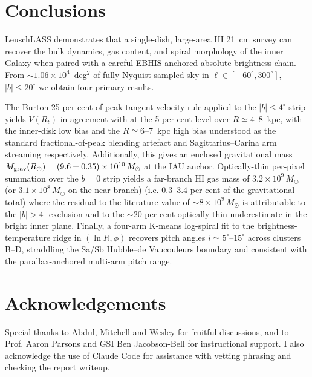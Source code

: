 \documentclass[10pt,preprint2]{aastex}
\begin{document}
\section{Conclusions}
\label{sec:conclusions}

LeuschLASS demonstrates that a single-dish, large-area HI 21~cm survey can recover the bulk dynamics, gas content, and spiral morphology of the inner Galaxy when paired with a careful EBHIS-anchored absolute-brightness chain. From $\sim 1.06\times 10^{4}$~deg$^{2}$ of fully Nyquist-sampled sky in $\ell \in [-60^\circ, 300^\circ]$, $|b|\le 20^\circ$ we obtain four primary results.

The Burton 25-per-cent-of-peak tangent-velocity rule applied to the $|b|\le 4^\circ$ strip yields $V(R_t)$ in agreement with \citet{BrandBlitz1993} at the 5-per-cent level over $R \simeq 4$--$8$~kpc, with the inner-disk low bias and the $R \simeq 6$--$7$~kpc high bias understood as the standard fractional-of-peak blending artefact and Sagittarius--Carina arm streaming respectively. Additionally, this gives an enclosed gravitational mass $M_{\rm grav}(R_\odot) = (9.6 \pm 0.35)\times 10^{10}\,M_\odot$ at the IAU anchor. Optically-thin per-pixel summation over the $b=0$ strip yields a far-branch HI gas mass of $3.2\times 10^{9}\,M_\odot$ (or $3.1\times 10^{8}\,M_\odot$ on the near branch) (i.e. $0.3$--$3.4$ per cent of the gravitational total) where the residual to the literature value of $\sim 8\times 10^{9}\,M_\odot$ \citep{KalberlaKerp2009} is attributable to the $|b|>4^\circ$ exclusion and to the $\sim 20$ per cent optically-thin underestimate in the bright inner plane. Finally, a four-arm K-means log-spiral fit to the brightness-temperature ridge in $(\ln R, \phi)$ recovers pitch angles $i \simeq 5^\circ$--$15^\circ$ across clusters B--D, straddling the Sa/Sb Hubble--de Vaucouleurs boundary and consistent with the parallax-anchored \citet{Reid2014} multi-arm pitch range.

\section*{Acknowledgements}

Special thanks to Abdul, Mitchell and Wesley for fruitful discussions,
and to Prof. Aaron Parsons and GSI Ben Jacobson-Bell for instructional support.
I also acknowledge the use of Claude Code for assistance
with vetting phrasing and checking the report writeup.



\end{document}
